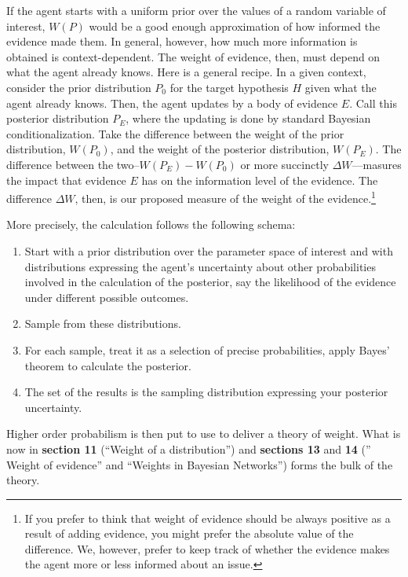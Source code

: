 \documentclass[
  10pt,
  dvipsnames,enabledeprecatedfontcommands]{scrartcl}
\begin{document}
If the agent starts with a uniform prior over the values of a random
variable of interest, \(W(P)\) would be a good enough approximation of
how informed the evidence made them. In general, however, how much more
information is obtained is context-dependent. The weight of evidence,
then, must depend on what the agent already knows. Here is a general
recipe. In a given context, consider the prior distribution \(P_0\) for
the target hypothesis \(H\) given what the agent already knows. Then,
the agent updates by a body of evidence \(E\). Call this posterior
distribution \(P_E\), where the updating is done by standard Bayesian
conditionalization. Take the difference between the weight of the prior
distribution, \(W(P_0)\), and the weight of the posterior distribution,
\(W(P_E)\). The difference between the two--\(W(P_E)-W(P_0)\) or more
succinctly \(\Delta W\)---masures the impact that evidence \(E\) has on
the information level of the evidence. The difference \(\Delta W\),
then, is our proposed measure of the weight of the evidence.\footnote{If
  you prefer to think that weight of evidence should be always positive
  as a result of adding evidence, you might prefer the absolute value of
  the difference. We, however, prefer to keep track of whether the
  evidence makes the agent more or less informed about an issue.}

More precisely, the calculation follows the following schema:

\begin{enumerate}
\item Start with a prior distribution over the parameter space of interest and with distributions expressing the agent's uncertainty about other probabilities involved in the calculation of the posterior, say the likelihood of the evidence under different possible outcomes.
\item Sample from these distributions.
\item For each sample, treat it as a selection of precise probabilities, apply Bayes' theorem to calculate the posterior.
\item The set of the results is the sampling distribution expressing your posterior uncertainty.
\end{enumerate}

Higher order probabilism is then put to use to deliver a theory of
weight. What is now in \textbf{section 11} (``Weight of a
distribution'') and \textbf{sections 13} and \textbf{14} ('' Weight of
evidence'' and ``Weights in Bayesian Networks'') forms the bulk of the
theory.
\end{document}

